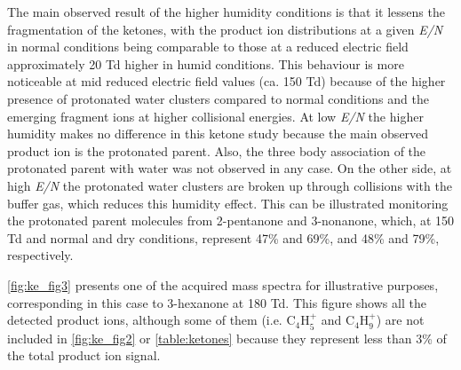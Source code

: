 The main observed result of the higher humidity conditions is that it lessens the fragmentation of the ketones, with the product ion distributions at a given \textit{E/N} in normal conditions being comparable to those at a reduced electric field approximately 20 Td higher in humid conditions. 
This behaviour is more noticeable at mid reduced electric field values (ca. 150 Td) because of the higher presence of protonated water clusters compared to normal conditions and the emerging fragment ions at higher collisional energies.
At low \textit{E/N} the higher humidity makes no difference in this ketone study because the main observed product ion is the protonated parent. %
Also, the three body association of the protonated parent with water was not observed in any case. 
On the other side, at high \textit{E/N} the protonated water clusters are broken up through collisions with the buffer gas, which reduces this humidity effect.
This can be illustrated monitoring the protonated parent molecules from 2-pentanone and 3-nonanone, which, at 150 Td and normal and dry conditions, represent  47\% and 69\%, and 48\% and 79\%, respectively.





\autoref{fig:ke_fig3} presents one of the acquired mass spectra for illustrative purposes, corresponding in this case to 3-hexanone at 180 Td. This figure shows all the detected product ions, although some of them (i.e. C$_4$H$_5^+$ and C$_4$H$_9^+$) are not included in \autoref{fig:ke_fig2} or \autoref{table:ketones} because they represent less than 3\% of the total product ion signal.

